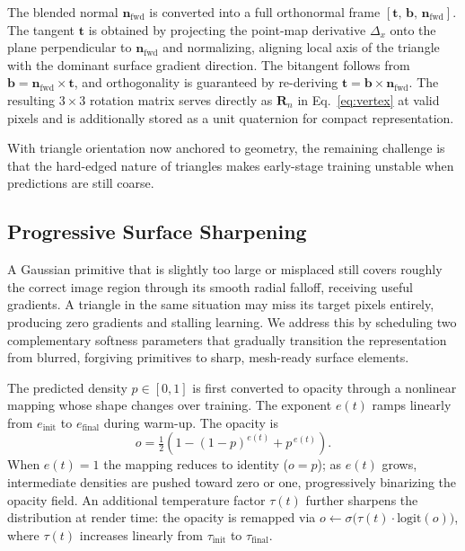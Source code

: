 The blended normal $\mathbf{n}_{\mathrm{fwd}}$ is converted into a full orthonormal frame $[\mathbf{t},\, \mathbf{b},\, \mathbf{n}_{\mathrm{fwd}}]$. The tangent $\mathbf{t}$ is obtained by projecting the point-map derivative $\Delta_x$ onto the plane perpendicular to $\mathbf{n}_{\mathrm{fwd}}$ and normalizing, aligning local axis of the triangle with the dominant surface gradient direction. The bitangent follows from $\mathbf{b} = \mathbf{n}_{\mathrm{fwd}} \times \mathbf{t}$, and orthogonality is guaranteed by re-deriving $\mathbf{t} = \mathbf{b} \times \mathbf{n}_{\mathrm{fwd}}$. The resulting $3\!\times\!3$ rotation matrix serves directly as $\mathbf{R}_n$ in Eq.~\eqref{eq:vertex} at valid pixels and is additionally stored as a unit quaternion for compact representation. 

With triangle orientation now anchored to geometry, the remaining challenge is that the hard-edged nature of triangles makes early-stage training unstable when predictions are still coarse.

\subsection{Progressive Surface Sharpening}
\label{sec:progressive}

A Gaussian primitive that is slightly too large or misplaced still covers roughly the correct image region through its smooth radial falloff, receiving useful gradients. A triangle in the same situation may miss its target pixels entirely, producing zero gradients and stalling learning. We address this by scheduling two complementary softness parameters that gradually transition the representation from blurred, forgiving primitives to sharp, mesh-ready surface elements.

The predicted density $p\!\in\![0,1]$ is first converted to opacity through a nonlinear mapping whose shape changes over training. The exponent $e(t)$ ramps linearly from $e_{\mathrm{init}}$ to $e_{\mathrm{final}}$ during warm-up. The opacity is
\begin{equation}
    o = \tfrac{1}{2}\!\left(1 - (1-p)^{e(t)} + p^{\,e(t)}\right).
    \label{eq:opacity}
\end{equation}
When $e(t)\!=\!1$ the mapping reduces to identity ($o\!=\!p$); as $e(t)$ grows, intermediate densities are pushed toward zero or one, progressively binarizing the opacity field. An additional temperature factor $\tau(t)$ further sharpens the distribution at render time: the opacity is remapped via $o \leftarrow \sigma\!\bigl(\tau(t)\cdot\mathrm{logit}(o)\bigr)$, where $\tau(t)$ increases linearly from $\tau_{\mathrm{init}}$ to $\tau_{\mathrm{final}}$.

